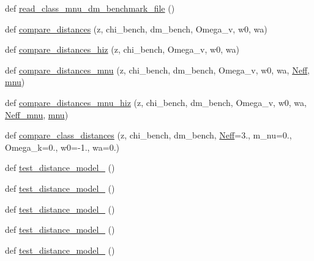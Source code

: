 \begin{DoxyCompactItemize}
\item 
def \mbox{\hyperlink{namespaceccl__test__distances_a3c41444e8d68b50c2d1465464e08b5e2}{read\+\_\+class\+\_\+mnu\+\_\+dm\+\_\+benchmark\+\_\+file}} ()
\item 
def \mbox{\hyperlink{namespaceccl__test__distances_ab82b4c6c6e09365fb75f5d938c256534}{compare\+\_\+distances}} (z, chi\+\_\+bench, dm\+\_\+bench, Omega\+\_\+v, w0, wa)
\item 
def \mbox{\hyperlink{namespaceccl__test__distances_a73d0450ebec8e25f65fb0c27498f7acd}{compare\+\_\+distances\+\_\+hiz}} (z, chi\+\_\+bench, Omega\+\_\+v, w0, wa)
\item 
def \mbox{\hyperlink{namespaceccl__test__distances_a0cce8b8b66ddb4e327b1905ca907bb59}{compare\+\_\+distances\+\_\+mnu}} (z, chi\+\_\+bench, dm\+\_\+bench, Omega\+\_\+v, w0, wa, \mbox{\hyperlink{namespaceccl__test__distances_a23a5c8a12ec37f9ca3d0dc89fe1ae297}{Neff}}, \mbox{\hyperlink{namespaceccl__test__distances_a8e0e0198ea990e29a05cea77a670f0ab}{mnu}})
\item 
def \mbox{\hyperlink{namespaceccl__test__distances_a31ef9701c1a38e122ac4d470345c8758}{compare\+\_\+distances\+\_\+mnu\+\_\+hiz}} (z, chi\+\_\+bench, dm\+\_\+bench, Omega\+\_\+v, w0, wa, \mbox{\hyperlink{namespaceccl__test__distances_ae8ad2b14dae691b68145cfe94510ef92}{Neff\+\_\+mnu}}, \mbox{\hyperlink{namespaceccl__test__distances_a8e0e0198ea990e29a05cea77a670f0ab}{mnu}})
\item 
def \mbox{\hyperlink{namespaceccl__test__distances_a2b5f40d54cab3c37be15ab14f8c855dc}{compare\+\_\+class\+\_\+distances}} (z, chi\+\_\+bench, dm\+\_\+bench, \mbox{\hyperlink{namespaceccl__test__distances_a23a5c8a12ec37f9ca3d0dc89fe1ae297}{Neff}}=3., m\+\_\+nu=0., Omega\+\_\+k=0., w0=-\/1., wa=0.)
\item 
def \mbox{\hyperlink{namespaceccl__test__distances_a13cbfbd552ff63e9f8dfe18e1784c32a}{test\+\_\+distance\+\_\+model\+\_}} ()
\item 
def \mbox{\hyperlink{namespaceccl__test__distances_affeb4b77ce49c9c351e3f177bea871eb}{test\+\_\+distance\+\_\+model\+\_}} ()
\item 
def \mbox{\hyperlink{namespaceccl__test__distances_aa017368b7bb80486c629854c912ba8c5}{test\+\_\+distance\+\_\+model\+\_}} ()
\item 
def \mbox{\hyperlink{namespaceccl__test__distances_ab745ddf53273403ccc7739ea7de4aba0}{test\+\_\+distance\+\_\+model\+\_}} ()
\item 
def \mbox{\hyperlink{namespaceccl__test__distances_a0569d89c95e633be4fae7644dee28541}{test\+\_\+distance\+\_\+model\+\_}} ()

\end{DoxyCompactItemize}
